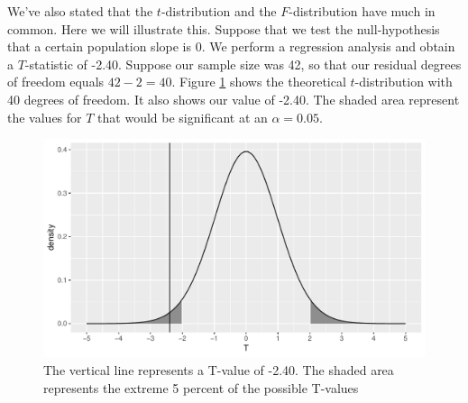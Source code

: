 \documentclass[]{report}\usepackage[]{graphicx}\usepackage[]{color}
\makeatletter
\def\maxwidth{ %
  \ifdim\Gin@nat@width>\linewidth
    \linewidth
  \else
    \Gin@nat@width
  \fi
}
\newenvironment{knitrout}{}{} %
\makeatother
\begin{document}
We've also stated that the $t$-distribution and the $F$-distribution have much in common. Here we will illustrate this. Suppose that we test the null-hypothesis that a certain population slope is 0. We perform a regression analysis and obtain a $T$-statistic of -2.40. Suppose our sample size was 42, so that our residual degrees of freedom equals $42-2=40$. Figure \ref{fig:dummy_23} shows the theoretical $t$-distribution with 40 degrees of freedom. It also shows our value of -2.40. The shaded area represent the values for $T$ that would be significant at an $\alpha=0.05$.   


\begin{knitrout}
\color{fgcolor}\begin{figure}

{\centering \includegraphics[width=\maxwidth]{figure/dummy_23-1} 

}

\caption[The vertical line represents a T-value of -2.40]{The vertical line represents a T-value of -2.40. The shaded area represents the extreme 5 percent of the possible T-values}\label{fig:dummy_23}
\end{figure}


\end{knitrout}
\end{document}
